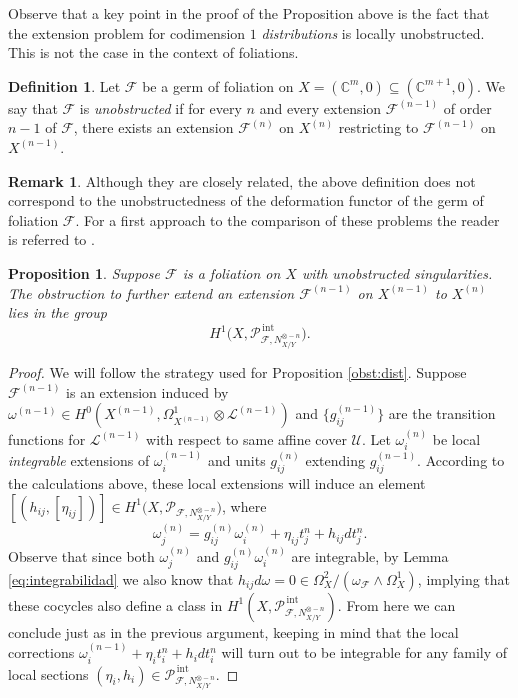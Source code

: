 \documentclass[reqno]{amsart}
\theoremstyle{plain}
\newcommand\C{\mathbb{C}}
\renewcommand{\L}{\mathcal{L}}
\newcommand{\U}{\mathcal{U}}
\newcommand{\F}{\mathscr{F}}
\newcommand{\PP}{\mathcal{P}}
\DeclareMathOperator{\Int}{int}
\newtheorem{proposition}[theorem]{Proposition}
\theoremstyle{definition}
\newtheorem{definition}[theorem]{Definition}
\newtheorem{remark}[theorem]{Remark}
\theoremstyle{named}
\begin{document}
Observe that a key point in the proof of the Proposition above is the fact that the extension problem for codimension $1$ \emph{distributions} is locally unobstructed. This is not the case in the context of foliations. 

\begin{definition} \label{def:unobstruced}
    Let $\F$ be a germ of foliation on $X=(\C^m,0)\subseteq (\C^{m+1},0)$. We say that $\F$ is \textit{unobstructed} if for every $n$ and every extension $\F^{(n-1)}$ of order $n-1$ of $\F$, there exists an extension $\F^{(n)}$ on $X^{(n)}$ restricting to $\F^{(n-1)}$ on $X^{(n-1)}$. 
\end{definition}

\begin{remark}
    Although they are closely related, the above definition does not correspond to the unobstructedness of the deformation functor of the germ of foliation $\F$. For a first approach to the comparison of these problems the reader is referred to \cite[Section I.7]{suwa1992unfoldings}.
\end{remark}


\begin{proposition}\label{obst:h1_pint}
Suppose $\F$ is a foliation on $X$ with unobstructed singularities. The obstruction to further extend an extension $\F^{(n-1)}$ on $X^{(n-1)}$ to  $X^{(n)}$ lies in the group 
    $$H^1\big(X,\PP_{\F,N_{X/Y}^{\otimes - n}}^{\,\Int}\big).$$ 
\end{proposition}
\begin{proof}
We will follow the strategy used for Proposition \ref{obst:dist}.  Suppose $\F^{(n-1)}$ is an extension induced by $\omega^{(n-1)}\in H^0(X^{(n-1)},\Omega^1_{X^{(n-1)}}\otimes \L^{(n-1)})$ and $\big\{g_{ij}^{(n-1)}\big\}$ are the transition functions for $\L^{(n-1)}$ with respect to same affine cover $\U$. Let $\omega_i^{(n)}$ be local \emph{integrable} extensions of $\omega_i^{(n-1)}$ and units $g_{ij}^{(n)}$ extending $g_{ij}^{(n-1)}$. According to the calculations above, these local extensions will induce an element $[(h_{ij},[\eta_{ij}])]\in H^1\big(X,\PP_{\F,N_{X/Y}^{\otimes - n}}\big)$,
where 
$$\omega^{(n)}_j = g_{ij}^{(n)}\omega_i^{(n)} + \eta_{ij} t_j^n+ h_{ij}dt_j^n. $$
Observe that since both $\omega^{(n)}_j$ and $g_{ij}^{(n)}\omega_i^{(n)}$ are integrable, by Lemma \ref{eq:integrabilidad} we also know that $h_{ij}d\omega=0\in \Omega_X^2/(\omega_\F\wedge \Omega^1_X)$, implying that these cocycles also define a class in $H^1(X,\PP_{\F,N_{X/Y}^{\otimes - n}}^{\,\Int})$. From here we can conclude just as in the previous argument, keeping in mind that the local corrections $\omega_i^{(n-1)}+ \eta_it_i^n+h_idt_i^n$ will turn out to be integrable for any family of local sections $(\eta_i,h_i)\in \PP_{\F,N_{X/Y}^{\otimes - n}}^{\,\Int}$.
\end{proof}
\end{document}
